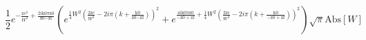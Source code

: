 \documentclass{article}
\begin{document}
\[\frac{1}{2} e^{-\frac{\text{zc}^2}{W^2}+\frac{2 i \text{k0} \pi  \text{z0}}{\text{z0}-\text{zf}}} \left(e^{\frac{1}{4} W^2 \left(\frac{2 \text{zc}}{W^2}-2
i \pi  \left(k+\frac{\text{k0}}{\text{z0}-\text{zf}}\right)\right)^2}+e^{\frac{4 i \text{k0} \pi  \text{z0}}{-\text{z0}+\text{zf}}+\frac{1}{4} W^2
\left(\frac{2 \text{zc}}{W^2}-2 i \pi  \left(k+\frac{\text{k0}}{-\text{z0}+\text{zf}}\right)\right)^2}\right) \sqrt{\pi } \text{Abs}[W]\]
\end{document}
